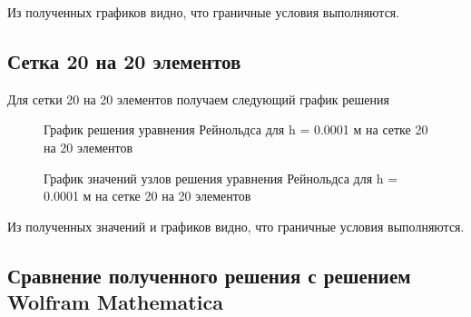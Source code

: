 \documentclass[a4paper,14pt]{extarticle}
\begin{document}
Из полученных графиков видно, что граничные условия выполняются.

\newpage

\subsection{Сетка 20 на 20 элементов}

Для сетки 20 на 20 элементов получаем следующий   график решения

\begin{figure}[!htbp]
	\caption{График решения уравнения Рейнольдса для h = 0.0001 м на сетке 20 на 20 элементов}
	\label{20x20mesh}
\end{figure}
\begin{figure}[!htbp]
	\caption{График значений узлов решения уравнения Рейнольдса для h = 0.0001 м на сетке 20 на 20 элементов}
	\label{20x20points}
\end{figure}

Из полученных значений и графиков видно, что граничные условия выполняются.

\subsection{Сравнение полученного решения с решением Wolfram Mathematica}
\end{document}
